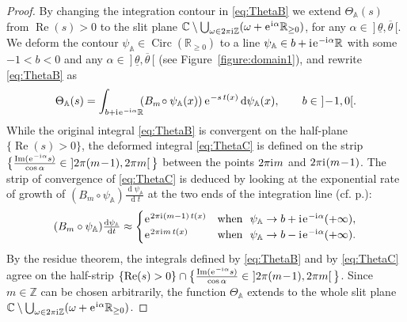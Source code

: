 \documentclass[a4paper,11pt]{amsart}
\numberwithin{equation}{section}
\newcommand{\C}{{\mathbb C}}
\newcommand{\Z}{{\mathbb Z}}
\newcommand{\R}{{\mathbb R}}
\newcommand{\sminus}{\setminus} %
\newcommand{\re}{\operatorname{Re}}
\renewcommand{\Re}{\operatorname{Re}}
\newcommand{\im}{\operatorname{Im}}
\renewcommand{\i}{\mathrm{i}\mkern.25\thinmuskip}
\renewcommand{\d}{\ensuremath{\operatorname{d}\!}}
\newcommand{\e}{\ensuremath{\mkern.25\thinmuskip\mathrm{e}\mkern.4\thinmuskip}}
\newcommand{\orbit}{\mathbb{A}}
\newcommand{\Circ}{\operatorname{Circ}}
\theoremstyle{definition}
\begin{document}
\begin{proof}
By changing the integration contour in \eqref{eq:ThetaB} we extend $\Theta_\orbit(s)$ from $\Re(s)>0$ to the slit plane $\C\sminus\bigcup_{\omega\in 2\pi\i \Z}(\omega+\e^{\i\alpha}\R_{\geq0})$, for any $\alpha\in\ ]\,\underline{\theta},\overline{\theta}\,[$.
We deform the contour  $\psi_\orbit\in\Circ(\R_{\geq 0})$  to a line $\psi_\orbit\in b+\i\e^{-\i\alpha}\R$ with some $-1<b<0$ and any $\alpha\in\ ]\,\underline{\theta},\overline{\theta}\,[$  (see Figure~\ref{figure:domain1}),
and rewrite \eqref{eq:ThetaB} as
\begin{equation}\label{eq:ThetaC}
\Theta_\orbit(s)=\int_{b+\i \e^{-\i\alpha}\R}\!\!(B_m\!\circ\psi_\orbit(x))\,\e^{-s\,t(x)}\d\psi_\orbit(x),\qquad b\in\ ]\!-\!1,0[.
\end{equation}
While the original integral \eqref{eq:ThetaB} is convergent on the half-plane $\{\re(s)>0\}$, the deformed integral \eqref{eq:ThetaC} is
defined on the strip
$\big\{\frac{\im(\e^{-\i \alpha}s)}{\cos\alpha}\in\ ]2\pi(m\!-\!1),2\pi m[\,\big\}$ between the points $2\pi\i m$ and $2\pi\i(m\!-\!1)$. 
The strip of convergence of \eqref{eq:ThetaC} is deduced by looking at the exponential rate of growth of $(B_m\circ\psi_\orbit)\tfrac{\d\psi_\orbit}{\d t}$ at the two 
ends of the integration line (cf. p.\pageref{p:borel}):
\[(B_m\circ\psi_\orbit)\tfrac{\d\psi_\orbit}{\d t}\approx\begin{cases}
\e^{2\pi\i(m-1)\,t(x)}&\text{when }\ \psi_\orbit\to b+\i\e^{-\i\alpha}(+\infty),\\
\e^{2\pi\i m\,t(x)}&\text{when }\ \psi_\orbit\to b-\i\e^{-\i\alpha}(+\infty).
\end{cases}\]
By the residue theorem, the integrals defined by \eqref{eq:ThetaB} and by \eqref{eq:ThetaC}  agree on the half-strip $\{\Re(s)>0\}\cap \big\{\frac{\im(\e^{-\i \alpha}s)}{\cos\alpha}\in\ ]2\pi(m\!-\!1),2\pi m[\,\big\}$.
Since $m\in\mathbb Z$ can be chosen arbitrarily,
the function $\Theta_\orbit$ extends to the whole slit plane $\C\sminus\bigcup_{\omega\in 2\pi\i \Z}(\omega+\e^{\i\alpha}\R_{\geq0})$.


\smallskip


\end{proof}
\end{document}
